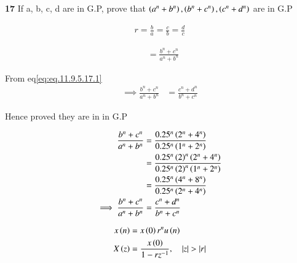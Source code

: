 \documentclass[journal,12pt,twocolumn]{IEEEtran}
\theoremstyle{remark}
\begin{document}


\vspace{3cm}

\title{}
\author{EE23BTECH11047 - Deepakreddy P
}
\maketitle
\newpage
\bigskip

\noindent \textbf{17} \quad 
If a, b, c, d are in G.P, prove that 
$ \left(a^{n} + b^{n}\right),\left(b^{n} + c^{n}\right),\left(c^{n} + d^{n}\right) $ are in G.P \\
\solution


\begin{align}   
r=\frac{b}{a} = \frac{c}{b}= \frac{d}{c} \label{eq:eq.11.9.5.17.1}
\end{align}

\begin{align} 
   &= \frac{b^n + c^n }{a^n + b^n}
\end{align}

From eq\eqref{eq:eq.11.9.5.17.1}\\

\begin{align}
\implies \frac{b^n + c^n }{a^n + b^n} &= \frac{c^n + d^n}{b^n + c^n}
\end{align}

Hence proved they are in in G.P

\bigskip  
\begin{center}
    \begin{table}[ht]
        
    \end{table}
\end{center}

\begin{align}
\frac{b^n + c^n}{a^n + b^n} &= \frac{0.25^n \left(2^n + 4^n\right)}{0.25^n \left(1^n + 2^n\right)}\\
&= \frac{0.25^n  \left(2\right)^n \left(2^n + 4^n\right)}{0.25^n \left(2\right)^n \left(1^n + 2^n\right)}\\
&= \frac{0.25^n \left(4^n + 8^n\right)}{0.25^n \left(2^n + 4^n\right)}\\
\implies \frac{b^n + c^n }{a^n + b^n} &= \frac{c^n + d^n}{b^n + c^n}
\end{align}

\begin{align}
    x\brak{n} &= x\brak{0}r^{n} u\brak{n}\\
    X\brak{z} &= \frac{x\brak{0}}{1-rz^{-1}}, \quad |z|>|r|
\end{align}
\end{document}
